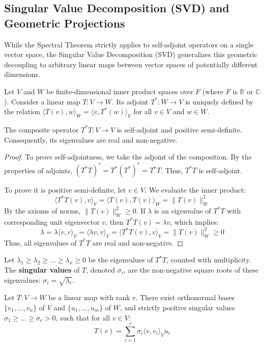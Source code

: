 \subsection{Singular Value Decomposition (SVD) and Geometric Projections}

While the Spectral Theorem strictly applies to self-adjoint operators on a single vector space, the Singular Value Decomposition (SVD) generalizes this geometric decoupling to arbitrary linear maps between vector spaces of potentially different dimensions. 

Let $V$ and $W$ be finite-dimensional inner product spaces over $F$ (where $F$ is $\mathbb{R}$ or $\mathbb{C}$). Consider a linear map $T: V \to W$. Its adjoint $T^*: W \to V$ is uniquely defined by the relation $\langle T(v), w \rangle_W = \langle v, T^*(w) \rangle_V$ for all $v \in V$ and $w \in W$.

\begin{lemma}
The composite operator $T^*T: V \to V$ is self-adjoint and positive semi-definite. Consequently, its eigenvalues are real and non-negative.
\end{lemma}

\begin{proof}
To prove self-adjointness, we take the adjoint of the composition. By the properties of adjoints, $(T^*T)^* = T^*(T^*)^* = T^*T$. Thus, $T^*T$ is self-adjoint.

To prove it is positive semi-definite, let $v \in V$. We evaluate the inner product:
$$ \langle T^*T(v), v \rangle_V = \langle T(v), T(v) \rangle_W = \|T(v)\|_W^2 $$
By the axioms of norms, $\|T(v)\|_W^2 \ge 0$. If $\lambda$ is an eigenvalue of $T^*T$ with corresponding unit eigenvector $v$, then $T^*T(v) = \lambda v$, which implies:
$$ \lambda = \lambda \langle v, v \rangle_V = \langle \lambda v, v \rangle_V = \langle T^*T(v), v \rangle_V = \|T(v)\|_W^2 \ge 0 $$
Thus, all eigenvalues of $T^*T$ are real and non-negative.
\end{proof}

\begin{definition}
Let $\lambda_1 \ge \lambda_2 \ge \dots \ge \lambda_n \ge 0$ be the eigenvalues of $T^*T$, counted with multiplicity. The \textbf{singular values} of $T$, denoted $\sigma_i$, are the non-negative square roots of these eigenvalues: $\sigma_i = \sqrt{\lambda_i}$.
\end{definition}

\begin{theorem}
Let $T: V \to W$ be a linear map with rank $r$. There exist orthonormal bases $\{v_1, \dots, v_n\}$ of $V$ and $\{u_1, \dots, u_m\}$ of $W$, and strictly positive singular values $\sigma_1 \ge \dots \ge \sigma_r > 0$, such that for all $v \in V$:
$$ T(v) = \sum_{i=1}^r \sigma_i \langle v, v_i \rangle_V u_i $$
\end{theorem}

